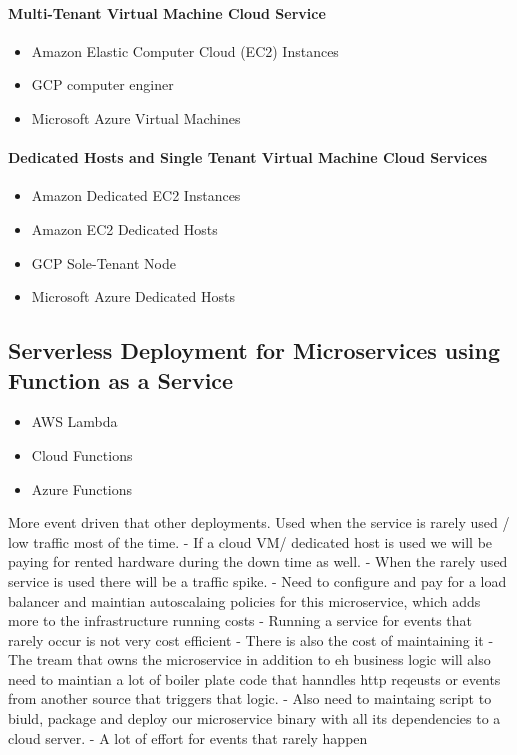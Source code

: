 \documentclass[a4paper, 11pt]{book}
\begin{document}
    \paragraph{Multi-Tenant Virtual Machine Cloud Service}
    \begin{itemize}
        \item Amazon Elastic Computer Cloud (EC2) Instances
        \item GCP computer enginer
        \item Microsoft Azure Virtual Machines
    \end{itemize}

    \paragraph{Dedicated Hosts and Single Tenant Virtual Machine Cloud Services}
    \begin{itemize}
        \item Amazon Dedicated EC2 Instances
        \item Amazon EC2 Dedicated Hosts
        \item GCP Sole-Tenant Node
        \item Microsoft Azure Dedicated Hosts
    \end{itemize}

    \subsection{Serverless Deployment for Microservices using Function as a Service}

    \begin{itemize}
        \item AWS Lambda
        \item Cloud Functions
        \item Azure Functions
    \end{itemize}

    More event driven that other deployments.
    Used when the service is rarely used / low traffic most of the time.
    - If a cloud VM/ dedicated host is used we will be paying for rented hardware during the down time as well.
    - When the rarely used service is used there will be a traffic spike.
    - Need to configure and pay for a load balancer and maintian autoscalaing policies for this microservice, which adds more to the infrastructure running costs
    - Running a service for events that rarely occur is not very cost efficient
    - There is also the cost of maintaining it
    - The tream that owns the microservice in addition to eh business logic will also need to maintian a lot of boiler plate code that hanndles http reqeusts or events from another source that triggers that logic.
    - Also need to maintaing script to biuld, package and deploy our microservice binary with all its dependencies to a cloud server.
    - A lot of effort for events that rarely happen
\end{document}
